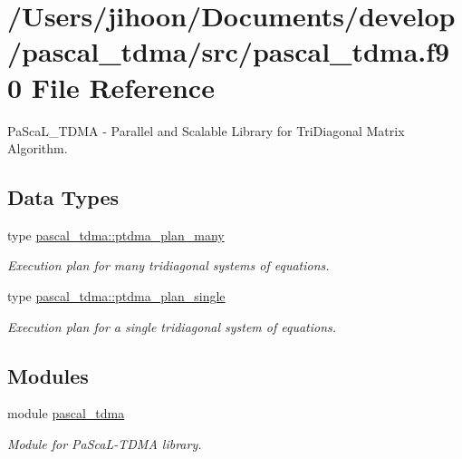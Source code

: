 \hypertarget{pascal__tdma_8f90}{}\section{/\+Users/jihoon/\+Documents/develop/pascal\+\_\+tdma/src/pascal\+\_\+tdma.f90 File Reference}
\label{pascal__tdma_8f90}


Pa\+Sca\+L\+\_\+\+T\+D\+MA -\/ Parallel and Scalable Library for Tri\+Diagonal Matrix Algorithm.  


\subsection*{Data Types}
\begin{DoxyCompactItemize}
\item 
type \mbox{\hyperlink{structpascal__tdma_1_1ptdma__plan__many}{pascal\+\_\+tdma\+::ptdma\+\_\+plan\+\_\+many}}
\begin{DoxyCompactList}\small\item\em Execution plan for many tridiagonal systems of equations. \end{DoxyCompactList}\item 
type \mbox{\hyperlink{structpascal__tdma_1_1ptdma__plan__single}{pascal\+\_\+tdma\+::ptdma\+\_\+plan\+\_\+single}}
\begin{DoxyCompactList}\small\item\em Execution plan for a single tridiagonal system of equations. \end{DoxyCompactList}\end{DoxyCompactItemize}
\subsection*{Modules}
\begin{DoxyCompactItemize}
\item 
module \mbox{\hyperlink{namespacepascal__tdma}{pascal\+\_\+tdma}}
\begin{DoxyCompactList}\small\item\em Module for Pa\+Sca\+L-\/\+T\+D\+MA library. \end{DoxyCompactList}\end{DoxyCompactItemize}
